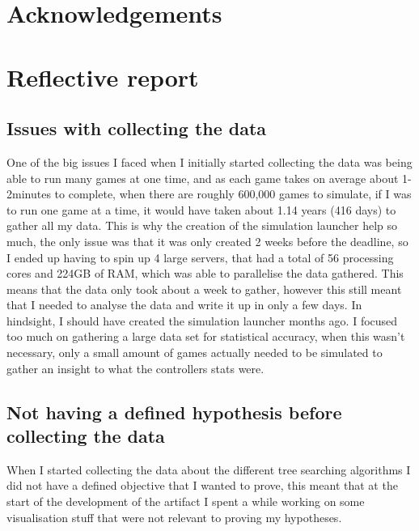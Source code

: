 \documentclass[journal]{IEEEtran}
\begin{document}
	\appendices
		\section{Acknowledgements}

		\section{Reflective report}
		\subsection{Issues with collecting the data}
			One of the big issues I faced when I initially started collecting the data was being able to run many games at one time, and as each game takes on average about 1-2minutes to complete, when there are roughly 600,000 games to simulate, if I was to run one game at a time, it would have taken about 1.14 years (416 days) to gather all my data. This is why the creation of the simulation launcher help so much, the only issue was that it was only created 2 weeks before the deadline, so I ended up having to spin up 4 large servers, that had a total of 56 processing cores and 224GB of RAM, which was able to parallelise the data gathered. This means that the data only took about a week to gather, however this still meant that I needed to analyse the data and write it up in only a few days. In hindsight, I should have created the simulation launcher months ago.
			I focused too much on gathering  a large data set for statistical accuracy, when this wasn't necessary, only a small amount of games actually needed to be simulated to gather an insight to what the controllers stats were.
		\subsection{Not having a defined hypothesis before collecting the data}
			When I started collecting the data about the different tree searching algorithms I did not have a defined objective that I wanted to prove, this meant that at the start of the development of the artifact I spent a while working on some visualisation stuff that were not relevant to proving my hypotheses.








\end{document}
